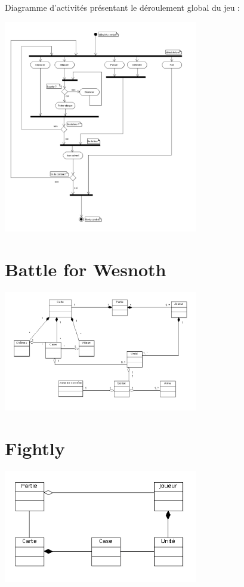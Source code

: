 \documentclass[a4paper,10pt]{report}
\begin{document}
    Diagramme d'activités présentant le déroulement global du jeu : 
    
    \includegraphics[width=320px]{diagrammes/sequence-homm.png}


	\section{Battle for Wesnoth}
	
		\includegraphics[width=320px]{diagrammes/Concept-Battle-of-Wesnoth.png}


	\section{Fightly}
	
		\includegraphics[width=320px]{diagrammes/concept-fightly.png}
\end{document}
